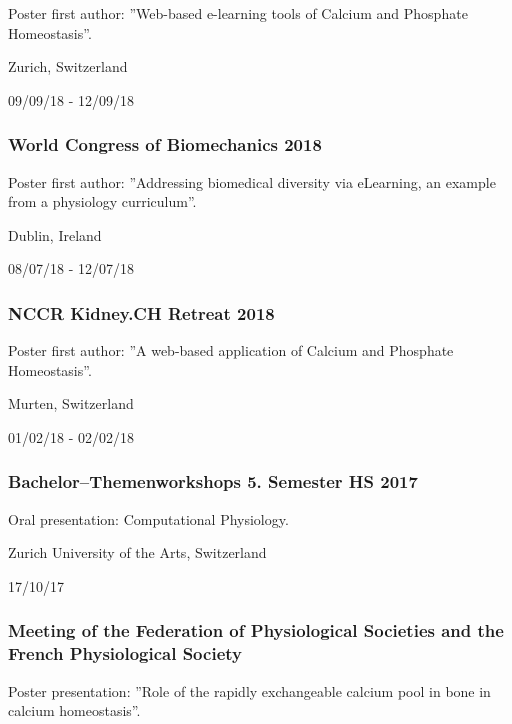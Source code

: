 \documentclass[
]{article}
\begin{document}
Poster first author: ''Web-based e-learning tools of Calcium and
Phosphate Homeostasis''.

Zurich, Switzerland

09/09/18 - 12/09/18

\hypertarget{world-congress-of-biomechanics-2018}{%
\subsubsection{World Congress of Biomechanics
2018}\label{world-congress-of-biomechanics-2018}}

Poster first author: ''Addressing biomedical diversity via eLearning, an
example from a physiology curriculum''.

Dublin, Ireland

08/07/18 - 12/07/18

\hypertarget{nccr-kidney.ch-retreat-2018}{%
\subsubsection{NCCR Kidney.CH Retreat
2018}\label{nccr-kidney.ch-retreat-2018}}

Poster first author: ''A web-based application of Calcium and Phosphate
Homeostasis''.

Murten, Switzerland

01/02/18 - 02/02/18

\hypertarget{bachelorthemenworkshops-5.-semester-hs-2017}{%
\subsubsection{Bachelor--Themenworkshops 5. Semester HS
2017}\label{bachelorthemenworkshops-5.-semester-hs-2017}}

Oral presentation: Computational Physiology.

Zurich University of the Arts, Switzerland

17/10/17

\hypertarget{meeting-of-the-federation-of-physiological-societies-and-the-french-physiological-society}{%
\subsubsection{Meeting of the Federation of Physiological Societies and
the French Physiological
Society}\label{meeting-of-the-federation-of-physiological-societies-and-the-french-physiological-society}}

Poster presentation: ''Role of the rapidly exchangeable calcium pool in
bone in calcium homeostasis''.
\end{document}
